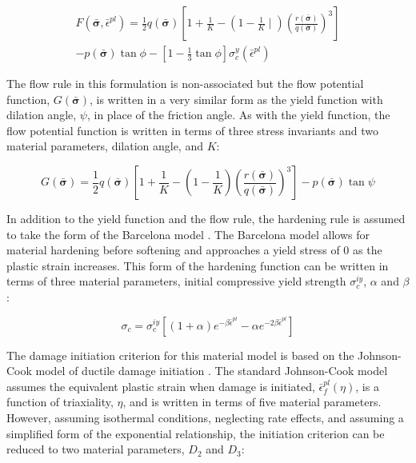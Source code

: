 \begin{multline}
F\left(\bar{\boldsymbol{\sigma}}, \bar{\epsilon}^{pl}\right)=
\frac{1}{2}q\left(\bar{\boldsymbol{\sigma}}\right)\left [ 1+\frac{1}{K}-\left ( 1-\frac{1}{K} \mid \right )\left ( \frac{r\left(\bar{\boldsymbol{\sigma}}\right)}{q\left(\bar{\boldsymbol{\sigma}}\right)} \right )^3 \right ] \\
- p\left(\bar{\boldsymbol{\sigma}}\right)\tan\phi - \left[1-\frac{1}{3}\tan\phi \right]\sigma_c^y\left(\bar{\epsilon}^{pl}\right)
\label{eqn:druc1}
\end{multline}

The flow rule in this formulation is non-associated but the flow potential function, $G\left(\bar{\boldsymbol{\sigma}}\right)$, is written in a very similar form as the yield function with dilation angle, $\psi$, in place of the friction angle. As with the yield function, the flow potential function is written in terms of three stress invariants and two material parameters, dilation angle, and $K$:

\begin{equation}
G\left(\bar{\boldsymbol{\sigma}}\right)=
\frac{1}{2}q\left(\bar{\boldsymbol{\sigma}}\right)\left [ 1+\frac{1}{K}-\left ( 1-\frac{1}{K} \right )\left ( \frac{r\left(\bar{\boldsymbol{\sigma}}\right)}{q\left(\bar{\boldsymbol{\sigma}}\right)} \right )^3 \right ] 
-p\left(\bar{\boldsymbol{\sigma}}\right)\tan\psi
\label{eqn:druc2}
\end{equation}

In addition to the yield function and the flow rule, the hardening rule is assumed to take the form of the Barcelona model \citep{lubliner_plastic-damage_1989}. The Barcelona model allows for material hardening before softening and approaches a yield stress of 0 as the plastic strain increases.  This form of the hardening function can be written in terms of three material parameters, initial compressive yield strength $\sigma_c^{iy}$, $\alpha$ and $\beta$:

\begin{equation}
\sigma_c=\sigma_c^{iy}\left [ \left ( 1+\alpha \right ) e^{-\beta\bar{\epsilon}^{pl}}-\alpha e^{-2\beta\bar{\epsilon}^{pl}}  \right ]
\label{eqn:druc3}
\end{equation}

The damage initiation criterion for this material model is based on the Johnson-Cook model of ductile damage initiation \citep{Johnson_1985}. The standard Johnson-Cook model assumes the equivalent plastic strain when damage is initiated, $\bar{\epsilon}_{f}^{pl}\left(\eta\right)$, is a function of triaxiality, $\eta$, and is written in terms of five material parameters. However, assuming isothermal conditions, neglecting rate effects, and assuming a simplified form of the exponential relationship, the initiation criterion can be reduced to two material parameters, $D_2$ and $D_3$:

